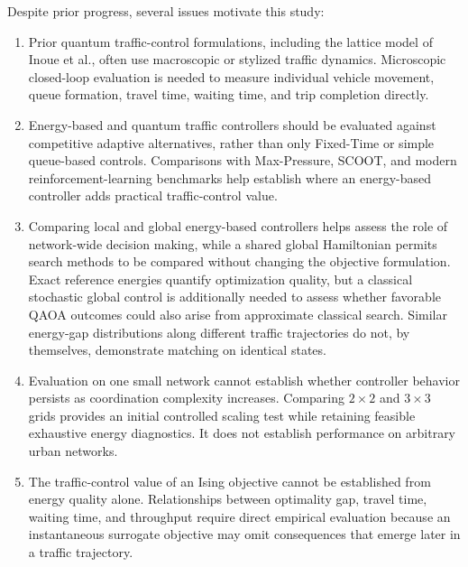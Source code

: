 Despite prior progress, several issues motivate this study:

\begin{enumerate}
\item Prior quantum traffic-control formulations, including the lattice model of Inoue et al., often use macroscopic or stylized traffic dynamics. Microscopic closed-loop evaluation is needed to measure individual vehicle movement, queue formation, travel time, waiting time, and trip completion directly.

\item Energy-based and quantum traffic controllers should be evaluated against competitive adaptive alternatives, rather than only Fixed-Time or simple queue-based controls. Comparisons with Max-Pressure, SCOOT, and modern reinforcement-learning benchmarks help establish where an energy-based controller adds practical traffic-control value.

\item Comparing local and global energy-based controllers helps assess the role of network-wide decision making, while a shared global Hamiltonian permits search methods to be compared without changing the objective formulation. Exact reference energies quantify optimization quality, but a classical stochastic global control is additionally needed to assess whether favorable QAOA outcomes could also arise from approximate classical search. Similar energy-gap distributions along different traffic trajectories do not, by themselves, demonstrate matching on identical states.

\item Evaluation on one small network cannot establish whether controller behavior persists as coordination complexity increases. Comparing $2\times2$ and $3\times3$ grids provides an initial controlled scaling test while retaining feasible exhaustive energy diagnostics. It does not establish performance on arbitrary urban networks.

\item The traffic-control value of an Ising objective cannot be established from energy quality alone. Relationships between optimality gap, travel time, waiting time, and throughput require direct empirical evaluation because an instantaneous surrogate objective may omit consequences that emerge later in a traffic trajectory.


\end{enumerate}
